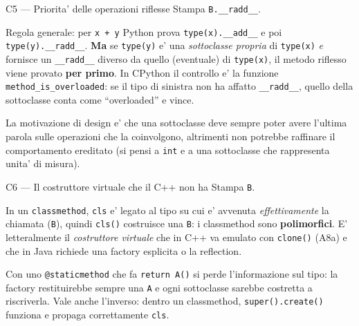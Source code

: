 \documentclass{report}
\newcommand{\code}[1]{\texttt{\small #1}}
\begin{document}
\begin{soluzione}{C5 --- Priorita' delle operazioni riflesse}
\label{sol:C5}
Stampa \code{B.\_\_radd\_\_}.

Regola generale: per \code{x + y} Python prova \code{type(x).\_\_add\_\_} e poi
\code{type(y).\_\_radd\_\_}. \textbf{Ma} se \code{type(y)} e' una
\emph{sottoclasse propria} di \code{type(x)} \emph{e} fornisce un
\code{\_\_radd\_\_} diverso da quello (eventuale) di \code{type(x)}, il metodo
riflesso viene provato \textbf{per primo}. In CPython il controllo e' la
funzione \code{method\_is\_overloaded}: se il tipo di sinistra non ha affatto
\code{\_\_radd\_\_}, quello della sottoclasse conta come ``overloaded'' e vince.

La motivazione di design e' che una sottoclasse deve sempre poter avere
l'ultima parola sulle operazioni che la coinvolgono, altrimenti non potrebbe
raffinare il comportamento ereditato (si pensi a \code{int} e a una sottoclasse
che rappresenta unita' di misura).
\end{soluzione}

\begin{soluzione}{C6 --- Il costruttore virtuale che il C++ non ha}
\label{sol:C6}
Stampa \code{B}.

In un \code{classmethod}, \code{cls} e' legato al tipo su cui e' avvenuta
\emph{effettivamente} la chiamata (\code{B}), quindi \code{cls()} costruisce una
\code{B}: i classmethod sono \textbf{polimorfici}. E' letteralmente il
\emph{costruttore virtuale} che in C++ va emulato con \code{clone()} (A8a) e
che in Java richiede una factory esplicita o la reflection.

Con uno \code{@staticmethod} che fa \code{return A()} si perde l'informazione
sul tipo: la factory restituirebbe sempre una \code{A} e ogni sottoclasse
sarebbe costretta a riscriverla. Vale anche l'inverso: dentro un classmethod,
\code{super().create()} funziona e propaga correttamente \code{cls}.
\end{soluzione}
\end{document}
